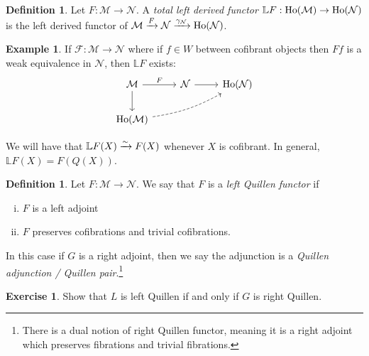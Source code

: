 \documentclass[12pt]{amsart}
\theoremstyle{definition}
\newtheorem{definition}[theorem]{Definition}
\newtheorem{example}[theorem]{Example}
\newtheorem{exercise}[theorem]{Exercise}
\begin{document}
\begin{definition} Let $F: \mathcal{M} \to \mathcal{N}$. A \textit{total left derived functor} $\mathbb{L}F: \text{Ho}(\mathcal{M}) \to \text{Ho}(\mathcal{N})$ is the left derived functor of $\mathcal{M} \xrightarrow{F} \mathcal{N} \xrightarrow{\gamma_\mathcal{N}} \text{Ho}(\mathcal{N})$.
\end{definition}


\begin{example} If $\mathcal{F}: \mathcal{M} \to \mathcal{N}$ where if $f\in W$ between cofibrant objects then $Ff$ is a weak equivalence in $\mathcal{N}$, then $\mathbb{L}F$ exists:
\[ \begin{tikzcd}
    \mathcal{M}\rar["F"]\dar & \mathcal{N}\rar & \Ho(\mathcal{N})\\
    \Ho(\mathcal{M})\ar[urr,bend right=10,dashed] &  & 
\end{tikzcd} \]
\end{example}

We will have that $\mathbb{L}F(X) \xrightarrow{\sim} F(X)$ whenever $X$ is cofibrant. In general, $\mathbb{L}F(X) = F(Q(X))$.

\begin{definition} Let $F: \mathcal{M} \to \mathcal{N}$. We say that $F$ is a \textit{left Quillen functor} if
\begin{enumerate}[(i)]
    \item $F$ is a left adjoint
    \item $F$ preserves cofibrations and trivial cofibrations.
\end{enumerate}
In this case if $G$ is a right adjoint, then we say the adjunction is a \textit{Quillen adjunction / Quillen pair}.\footnote{There is a dual notion of right Quillen functor, meaning it is a right adjoint which preserves fibrations and trivial fibrations.}
\end{definition}

\begin{exercise} Show that $L$ is left Quillen if and only if $G$ is right Quillen.
\end{exercise}
\end{document}
